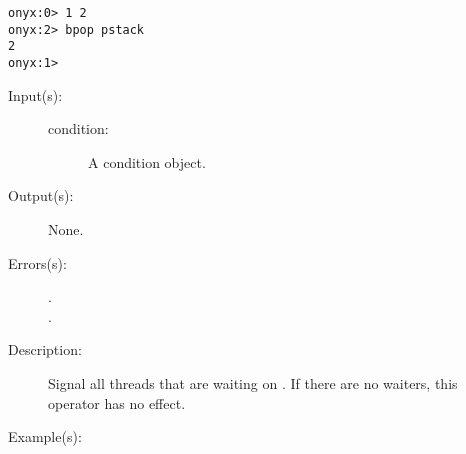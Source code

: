 \begin{description}
\begin{description}
\begin{verbatim}
onyx:0> 1 2
onyx:2> bpop pstack
2
onyx:1>
		\end{verbatim}
	\end{description}
\label{systemdict:broadcast}
\item[{\onyxop{condition}{broadcast}{--}}: ]
	\begin{description}\item[]
	\item[Input(s): ]
		\begin{description}\item[]
		\item[condition: ]
			A condition object.
		\end{description}
	\item[Output(s): ] None.
	\item[Errors(s): ]
		\begin{description}\item[]
		\item[.]
		\item[.]
		\end{description}
	\item[Description: ]
		Signal all threads that are waiting on .  If
		there are no waiters, this operator has no effect.
	\item[Example(s): ]\begin{verbatim}


\end{verbatim}
\end{description}
\end{description}
